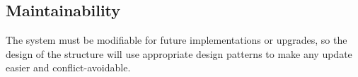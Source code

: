 \subsection{Maintainability}

The system must be modifiable for future implementations or upgrades, so the design of the structure will use appropriate design patterns to make any update easier and conflict-avoidable.  